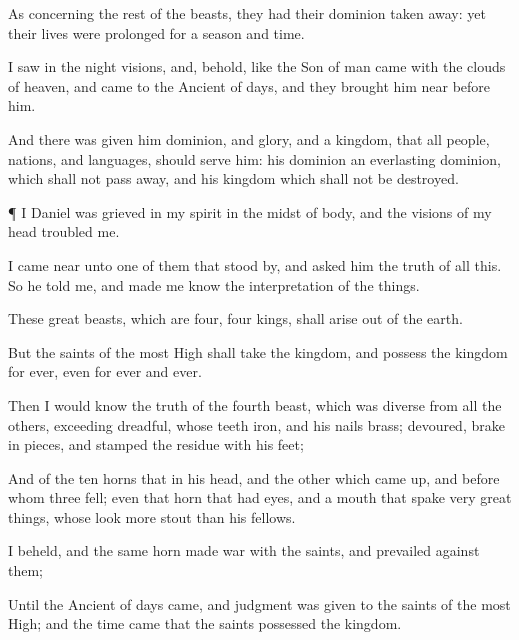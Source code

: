{As concerning the
rest of the
beasts, they had their
dominion taken
away: yet their
lives were
prolonged
for a
season and
time.

I
saw in the
night
visions, and,
behold,
{} like the
Son of
man
came
with the
clouds of
heaven, and
came
to the
Ancient of
days, and they brought him
near
before him.

And there was
given him
dominion, and
glory, and a
kingdom, that
all
people,
nations, and
languages, should
serve him: his
dominion
{} an
everlasting
dominion, which shall
not pass
away, and his
kingdom
{} which shall
not be
destroyed.


\par }{\PP {}¶
I
Daniel was
grieved in my
spirit in the
midst of
{}
body, and the
visions of my
head
troubled me.

I came
near
unto
one
of them that stood
by, and
asked
him the
truth of
all
this. So he
told me, and made me
know the
interpretation of the
things.

These
great
beasts,
which are
four,
{}
four
kings,
{} shall
arise out
of the
earth.

But the
saints of the most
High shall
take the
kingdom, and
possess the
kingdom
for
ever, even
for
ever and
ever.

Then I
would know the
truth
of the
fourth
beast, which
was
diverse
from
all the others,
exceeding
dreadful, whose
teeth
{}
iron, and his
nails
{}
brass;
{}
devoured, brake in
pieces, and
stamped the
residue with his
feet;

And
of the
ten
horns that
{} in his
head, and
{} the
other which came
up, and
before whom
three
fell; even
{} that
horn
that had
eyes, and a
mouth that
spake very great
things, whose
look
{}
more
stout
than his
fellows.

I
beheld, and the
same
horn
made
war
with the
saints, and
prevailed against them;

Until the
Ancient of
days
came, and
judgment was
given to the
saints of the most
High; and the
time
came that the
saints
possessed the
kingdom.

}
